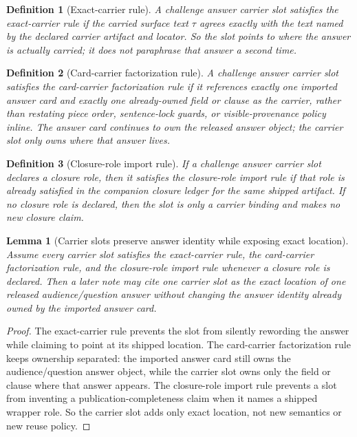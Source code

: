 \documentclass[11pt]{article}
\newtheorem{definition}{Definition}
\newtheorem{lemma}{Lemma}
\begin{document}
\begin{definition}[Exact-carrier rule]
A challenge answer carrier slot satisfies the \emph{exact-carrier rule} if the carried surface text $\tau$ agrees exactly with the text named by the declared carrier artifact and locator.
So the slot points to where the answer is actually carried; it does not paraphrase that answer a second time.
\end{definition}

\begin{definition}[Card-carrier factorization rule]
A challenge answer carrier slot satisfies the \emph{card-carrier factorization rule} if it references exactly one imported answer card and exactly one already-owned field or clause as the carrier, rather than restating piece order, sentence-lock guards, or visible-provenance policy inline.
The answer card continues to own the released answer object; the carrier slot only owns where that answer lives.
\end{definition}

\begin{definition}[Closure-role import rule]
If a challenge answer carrier slot declares a closure role, then it satisfies the \emph{closure-role import rule} if that role is already satisfied in the companion closure ledger for the same shipped artifact.
If no closure role is declared, then the slot is only a carrier binding and makes no new closure claim.
\end{definition}

\begin{lemma}[Carrier slots preserve answer identity while exposing exact location]
Assume every carrier slot satisfies the exact-carrier rule, the card-carrier factorization rule, and the closure-role import rule whenever a closure role is declared.
Then a later note may cite one carrier slot as the exact location of one released audience/question answer without changing the answer identity already owned by the imported answer card.
\end{lemma}

\begin{proof}
The exact-carrier rule prevents the slot from silently rewording the answer while claiming to point at its shipped location.
The card-carrier factorization rule keeps ownership separated: the imported answer card still owns the audience/question answer object, while the carrier slot owns only the field or clause where that answer appears.
The closure-role import rule prevents a slot from inventing a publication-completeness claim when it names a shipped wrapper role.
So the carrier slot adds only exact location, not new semantics or new reuse policy.\qedhere
\end{proof}
\end{document}
